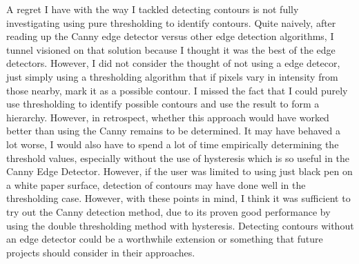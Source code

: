 \documentclass[11pt]{article}
\begin{document}
A regret I have with the way I tackled detecting contours is not fully 
investigating using pure thresholding to identify contours. Quite naively, 
after reading
up the Canny edge detector versus other edge detection algorithms, I tunnel
visioned on that solution because I thought it was the best of the edge 
detectors. However, I did not consider the thought of not using
a edge detecor, just simply using a thresholding algorithm that if pixels 
vary in intensity from those nearby, mark it as a possible contour. I
missed the fact that I could purely use thresholding to identify possible
contours and use the result to form a hierarchy. However, in retrospect,
whether this approach would have worked better than using the Canny 
remains to be determined. It may
have behaved a lot worse, I would also have to spend a lot of time 
empirically determining the threshold values, especially without the 
use of hysteresis which is so useful in the Canny Edge Detector. However, if
the user was limited to using just black pen on a white paper surface,
detection of contours may have done well in the thresholding case. However,
with these points in mind, I think it was sufficient to try out the 
Canny detection method, due to its proven good performance by using
the double thresholding method with hysteresis. Detecting contours
without an edge detector could be a worthwhile extension or something that
future projects should consider in their approaches.
\end{document}
